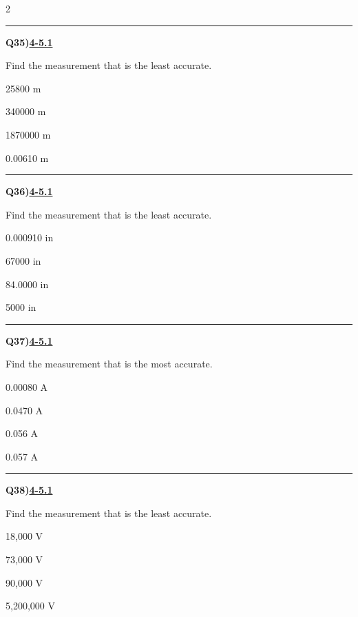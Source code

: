 \documentclass[11pt]{article}
\newenvironment{Qbox}[2]{%
  \par\medskip\noindent\begin{minipage}{\linewidth}%
  \hrule\medskip%
  \textbf{Q#1)}\hfill\textbf{\underline{#2}}\par\smallskip%
}{\par\end{minipage}\par\medskip}
\begin{document}
\begin{multicols}{2}
\begin{Qbox}{35}{4-5.1}
Find the measurement that is the least accurate.
\begin{choices}
  \item 25800 m
  \item 340000 m
  \item 1870000 m
  \item 0.00610 m
\end{choices}
\end{Qbox}

\begin{Qbox}{36}{4-5.1}
Find the measurement that is the least accurate.
\begin{choices}
  \item 0.000910 in
  \item 67000 in
  \item 84.0000 in
  \item 5000 in
\end{choices}
\end{Qbox}

\begin{Qbox}{37}{4-5.1}
Find the measurement that is the most accurate.
\begin{choices}
  \item 0.00080 A
  \item 0.0470 A
  \item 0.056 A
  \item 0.057 A
\end{choices}
\end{Qbox}

\begin{Qbox}{38}{4-5.1}
Find the measurement that is the least accurate.
\begin{choices}
  \item 18,000 V
  \item 73,000 V
  \item 90,000 V
  \item 5,200,000 V
\end{choices}
\end{Qbox}


\end{multicols}
\end{document}
